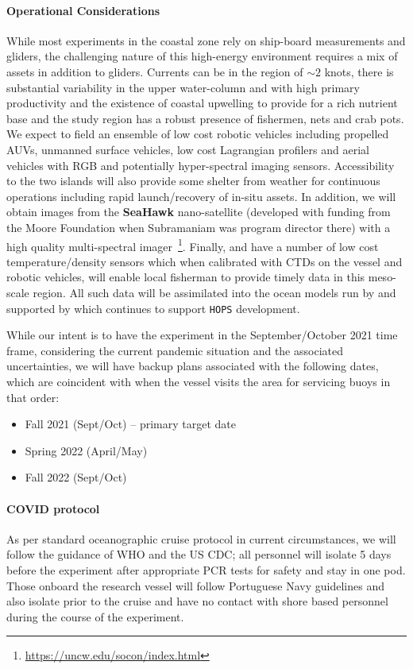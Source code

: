 \paragraph{Operational Considerations} While most experiments in the
coastal zone rely on ship-board measurements and gliders, the
challenging nature of this high-energy environment requires a mix of
assets in addition to gliders. Currents can be in the region of
$\sim 2$ knots, there is substantial variability in the upper
water-column and with high primary productivity and the existence of
coastal upwelling to provide for a rich nutrient base and the study
region has a robust presence of fishermen, nets and crab pots. We
expect to field an ensemble of low cost robotic vehicles including
propelled AUVs, unmanned surface vehicles, low cost Lagrangian
profilers and aerial vehicles with RGB and potentially hyper-spectral
imaging sensors. Accessibility to the two islands will also provide
some shelter from weather for continuous operations including rapid
launch/recovery of in-situ assets. In addition, we will obtain images
from the \textbf{SeaHawk} nano-satellite (developed with funding from
the Moore Foundation when Subramaniam was program director there) with
a high quality multi-spectral
imager~\footnote{\url{https://uncw.edu/socon/index.html}}. Finally,
\univ and \inst have a number of low cost temperature/density sensors
which when calibrated with CTDs on the vessel and robotic vehicles,
will enable local fisherman to provide timely data in this meso-scale
region. All such data will be assimilated into the ocean models run by
\inst and supported by \mit which continues to support \texttt{HOPS}
development.

While our intent is to have the experiment in the September/October 2021
time frame, considering the current pandemic situation and the
associated uncertainties, we will have backup plans associated with the
following dates, which are coincident with when the \inst vessel visits
the \naz area for servicing buoys in that order:

\begin{itemize}[noitemsep,topsep=0pt,parsep=0pt,partopsep=0pt]
\vspace{+0.25cm}
\item Fall 2021 (Sept/Oct) -- primary target date
\item Spring 2022 (April/May)
\item Fall 2022 (Sept/Oct) 

\end{itemize}  


\paragraph{COVID protocol} As per standard oceanographic cruise
protocol in current circumstances, we will follow the guidance of WHO
and the US CDC; all personnel will isolate 5 days before the
experiment after appropriate PCR tests for safety and stay in one
pod. Those onboard the \inst research vessel will follow Portuguese
Navy guidelines and also isolate prior to the cruise and have no
contact with shore based personnel during the course of the
experiment.

